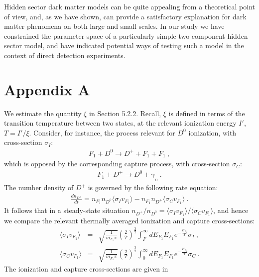 \documentclass[12pt]{article}
\begin{document}
{{Hidden sector dark matter models can be quite appealing from a
theoretical point of view, and, as we have shown, can provide a
satisfactory explanation for dark matter phenomena on both large and
small scales. In our study we have constrained the parameter space of a
particularly simple two component hidden sector model, and have
indicated potential ways of testing such a model in the context of
direct detection experiments.


\section*{Appendix A}

We estimate the quantity $\xi$ in Section 5.2.2. Recall, $\xi$ is
defined in terms of the transition temperature between two states, at
the relevant ionization energy $I'$, $T = I'/\xi$. Consider, for
instance, the process relevant for $D ^0$ ionization, with cross-section
$\sigma _I$:
%
\begin{eqnarray}
F_1 + D ^0 \rightarrow D ^+ + F_1 + F_1 \ ,
\label{ionziationd}
\end{eqnarray}
%
which is opposed by the corresponding capture process, with
cross-section $\sigma _C$:
%
\begin{eqnarray}
F_1 + D ^+ \rightarrow D ^0 + \gamma _{_D} \ .
\label{captured}
\end{eqnarray}
%
The number density of $D ^+$ is governed by the following rate equation:
%
\begin{eqnarray}
\frac{dn _{D ^+}}{dt} = n _{F_1}n _{D ^0}\langle \sigma _Iv
_{F_1}\rangle - n _{F_1}n _{D ^+}\langle \sigma _Cv _{F_1}\rangle \ .
\label{ratedp}
\end{eqnarray}
%
It follows that in a steady-state situation $n _{D ^+}/n _{D ^0}=\langle
\sigma _Iv _{F_1} \rangle/\langle \sigma _Cv _{F_1} \rangle$, and hence
we compare the relevant thermally averaged ionization and capture
cross-sections:
%
\begin{eqnarray}
\langle \sigma _Iv _{F_1} \rangle &=& \sqrt{\frac{1}{m _{F_1}\pi}}\left
(\frac{2}{T}\right ) ^{\frac{3}{2}}\int _{I'} ^{\infty} dE _{F_1}E
_{F_1}e ^{-\frac{E _{F_1}}{T}}\sigma _I \ , \nonumber \\
\langle \sigma _Cv _{F_1} \rangle &=& \sqrt{\frac{1}{m _{F_1}\pi}}\left
(\frac{2}{T}\right ) ^{\frac{3}{2}}\int _0 ^{\infty} dE _{F_1}E _{F_1}e
^{-\frac{E _{F_1}}{T}}\sigma _C \ .
\label{sigivsigcv}
\end{eqnarray}
%
The ionization and capture cross-sections are given in
}}
\end{document}
